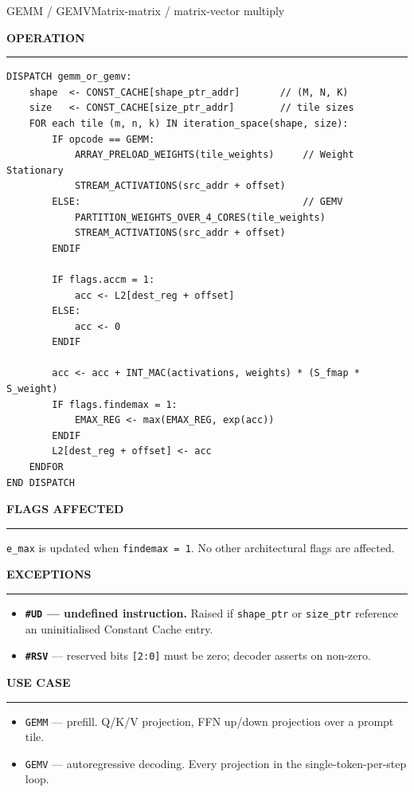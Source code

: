 \documentclass[11pt,a4paper,twoside,openany]{report}
\newcommand{\RefSection}[1]{%
  \par\medskip
  {\sffamily\bfseries\color{oceanblue}\normalsize\MakeUppercase{#1}}
  \par\vspace{-0.4em}
  {\color{oceanblue}\rule{\linewidth}{0.4pt}}\par\smallskip
}
\begin{document}
\begin{InstructionRef}{GEMM / GEMV}{Matrix-matrix / matrix-vector multiply}
\RefSection{Operation}

\begin{lstlisting}[style=pseudo]
DISPATCH gemm_or_gemv:
    shape  <- CONST_CACHE[shape_ptr_addr]       // (M, N, K)
    size   <- CONST_CACHE[size_ptr_addr]        // tile sizes
    FOR each tile (m, n, k) IN iteration_space(shape, size):
        IF opcode == GEMM:
            ARRAY_PRELOAD_WEIGHTS(tile_weights)     // Weight Stationary
            STREAM_ACTIVATIONS(src_addr + offset)
        ELSE:                                       // GEMV
            PARTITION_WEIGHTS_OVER_4_CORES(tile_weights)
            STREAM_ACTIVATIONS(src_addr + offset)
        ENDIF

        IF flags.accm = 1:
            acc <- L2[dest_reg + offset]
        ELSE:
            acc <- 0
        ENDIF

        acc <- acc + INT_MAC(activations, weights) * (S_fmap * S_weight)
        IF flags.findemax = 1:
            EMAX_REG <- max(EMAX_REG, exp(acc))
        ENDIF
        L2[dest_reg + offset] <- acc
    ENDFOR
END DISPATCH
\end{lstlisting}

\RefSection{Flags affected}

\texttt{e\_max} is updated when \texttt{findemax = 1}. No other
architectural flags are affected.

\RefSection{Exceptions}

\begin{itemize}[leftmargin=*, itemsep=0.2ex]
  \item \textbf{\texttt{\#UD} --- undefined instruction.} Raised if
        \texttt{shape\_ptr} or \texttt{size\_ptr} reference an
        uninitialised Constant Cache entry.
  \item \textbf{\texttt{\#RSV}} --- reserved bits \texttt{[2:0]}
        must be zero; decoder asserts on non-zero.
\end{itemize}

\RefSection{Use case}

\begin{itemize}[leftmargin=*, itemsep=0.2ex]
  \item \texttt{GEMM} --- prefill. Q/K/V projection, FFN up/down
        projection over a prompt tile.
  \item \texttt{GEMV} --- autoregressive decoding. Every projection
        in the single-token-per-step loop.
\end{itemize}
\end{InstructionRef}
\end{document}
